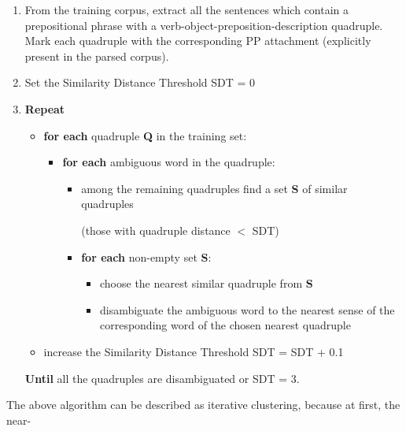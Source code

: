 {
\begin{enumerate}
\item 
From the training corpus, extract all the sentences which contain a prepositional phrase with a verb-object-preposition-description quadruple. Mark each quadruple with the corresponding PP attachment (explicitly present in the parsed corpus).

\item 
Set the Similarity Distance Threshold SDT = 0

\item 
{\bf Repeat}

\begin{itemize}
\item 
  {\bf for each} quadruple {\bf Q} in the training set:

\begin{itemize}
\item 
  {\bf for each} ambiguous word in the quadruple:

\begin{itemize}
\item 
  among the remaining quadruples find a set {\bf S} of similar quadruples 

  (those with quadruple distance $<$ SDT)

\item 
  {\bf for each} non-empty set {\bf S}:

\begin{itemize}
\item 
  choose the nearest similar quadruple from {\bf S}

\item 
  disambiguate the ambiguous word to the nearest sense of the corresponding word of the chosen nearest quadruple 
\end{itemize}
\end{itemize}
\end{itemize}

\item
  increase the Similarity Distance Threshold SDT = SDT + 0.1
\end{itemize}

{\bf Until} all the quadruples are disambiguated or SDT = 3.
\end{enumerate}
}

The\hspace{0.25mm} above\hspace{0.25mm} algorithm\hspace{0.25mm} can\hspace{0.25mm} be\hspace{0.25mm} described\hspace{0.25mm} as\hspace{0.25mm} iterative\hspace{0.25mm} clustering,\hspace{0.25mm} because\hspace{0.25mm} at\hspace{0.25mm} first,\hspace{0.25mm} the\hspace{0.25mm} near-


